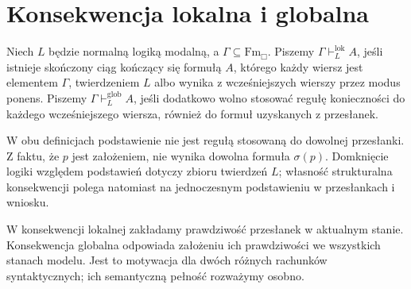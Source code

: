 \section{Konsekwencja lokalna i globalna}

\begin{definicja}
\label{def:ncl-modal-local-global}
Niech $L$ będzie normalną logiką modalną, a
$\Gamma\subseteq\mathrm{Fm}_{\Box}$.
Piszemy $\Gamma\vdash_L^{\mathrm{lok}} A$, jeśli
istnieje skończony ciąg kończący się formułą $A$,
którego każdy wiersz jest elementem $\Gamma$,
twierdzeniem $L$ albo wynika z wcześniejszych
wierszy przez modus ponens.
Piszemy $\Gamma\vdash_L^{\mathrm{glob}} A$,
jeśli dodatkowo wolno stosować regułę konieczności
do każdego wcześniejszego wiersza, również do
formuł uzyskanych z przesłanek.
\end{definicja}
W obu definicjach podstawienie nie jest regułą
stosowaną do dowolnej przesłanki. Z faktu, że
$p$ jest założeniem, nie wynika dowolna formuła
$\sigma(p)$. Domknięcie logiki względem podstawień
dotyczy zbioru twierdzeń $L$; własność strukturalna
konsekwencji polega natomiast na jednoczesnym
podstawieniu w przesłankach i wniosku.

W konsekwencji lokalnej zakładamy prawdziwość
przesłanek w aktualnym stanie. Konsekwencja
globalna odpowiada założeniu ich prawdziwości
we wszystkich stanach modelu. Jest to motywacja
dla dwóch różnych rachunków syntaktycznych;
ich semantyczną pełność rozważymy osobno.

